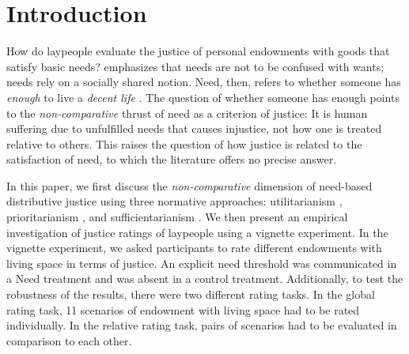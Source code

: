 \documentclass[12pt]{scrartcl}
\begin{document}
\renewcommand{\thefootnote}{\arabic{footnote}}\setcounter{footnote}{0}
\newpage


\section{Introduction}\label{sec:introduction}
How do laypeople evaluate the justice of personal endowments with goods that satisfy basic needs?
\cite{miller_principles_1999} emphasizes that needs are not to be confused with wants; needs rely on a socially shared notion.
Need, then, refers to whether someone has \textit{enough} \citep{frankfurt_inequality_2015} to live a \textit{decent life} \citep{miller_principles_1999}.
The question of whether someone has enough points to the \textit{non-comparative} \citep{feinberg_noncomparative_1974} thrust of need as a criterion of justice: It is human suffering due to unfulfilled needs that causes injustice, not how one is treated relative to others.
This raises the question of how justice is related to the satisfaction of need, to which the literature offers no precise answer.

In this paper, we first discuss the \textit{non-comparative} dimension of need-based distributive justice using three normative approaches: utilitarianism \citep[e.\,g.,][]{bentham_introduction_2009,mill_utilitarianism_1998}, prioritarianism \citep[e.\,g.,][]{parfit_equality_1997}, and sufficientarianism \citep[e.\,g.,][]{frankfurt_equality_1987,crisp_egalitarianism_2003,schramme_is_2006}.
We then present an empirical investigation of justice ratings of laypeople using a vignette experiment.
In the vignette experiment, we asked participants to rate different endowments with living space in terms of justice.
An explicit need threshold was communicated in a Need treatment and was absent in a control treatment.
Additionally, to test the robustness of the results, there were two different rating tasks.
In the global rating task, 11 scenarios of endowment with living space had to be rated individually.
In the relative rating task, pairs of scenarios had to be evaluated in comparison to each other.
\end{document}
